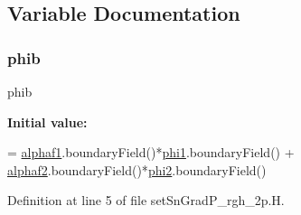 \subsection{Variable Documentation}
\mbox{\label{setSnGradP__rgh__2p_8H_a16fbbd62919987d4cfaebe0c4df71985}} 
\subsubsection{\texorpdfstring{phib}{phib}}
{\footnotesize\ttfamily phib}

{\bfseries Initial value\+:}
\begin{DoxyCode}
= 
    \hyperlink{refsAndControls__2p_8H_af5ff2b878e8d79c2bd7cf5385f55ea99}{alphaf1}.boundaryField()*\hyperlink{solveAlphaMULES_8H_a56f7cc5336f24e776556c927f6a53a15}{phi1}.boundaryField() 
+   \hyperlink{refsAndControls__2p_8H_afc54ce6b2d45999d802074c7c4d86cc8}{alphaf2}.boundaryField()*\hyperlink{solveAlphaMULES_8H_ae4c81f549c4d3c3eca025cef5736eae8}{phi2}.boundaryField()
\end{DoxyCode}


Definition at line 5 of file set\+Sn\+Grad\+P\+\_\+rgh\+\_\+2p.\+H.

